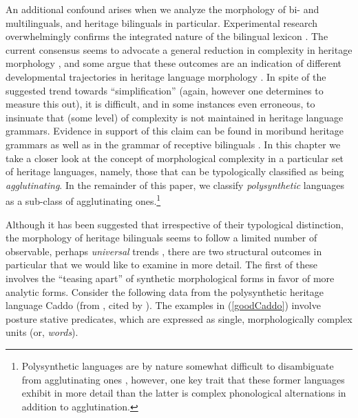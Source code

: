 \documentclass[output=paper,colorlinks,citecolor=brown,footheight=42pt]{langscibook}
\begin{document}
An additional confound arises when we analyze the morphology of bi- and multilinguals, and heritage bilinguals in particular. Experimental research overwhelmingly confirms the integrated nature of the bilingual lexicon \citep{kroll2014speech,PutnamEtAl2018}. The current consensus seems to advocate a general reduction in complexity in heritage morphology \citep{scontras2015,ScontrasEtAl2018}, and some argue that these outcomes are an indication of different developmental trajectories in heritage language morphology \citep{berdicevskis2020}. In spite of the suggested trend towards “simplification” (again, however one determines to measure this out), it is difficult, and in some instances even erroneous, to insinuate that (some level) of complexity is not maintained in heritage language grammars. Evidence in support of this claim can be found in moribund heritage grammars \citep{bousquette2020} as well as in the grammar of receptive bilinguals \citep{sherkinalieber2015}.   
In this chapter we take a closer look at the concept of morphological complexity in a particular set of heritage languages, namely, those that can be typologically classified as being \textit{agglutinating}. In the remainder of this paper, we classify \textit{polysynthetic} languages as a sub-class of agglutinating ones.{\footnote{Polysynthetic languages are by nature somewhat difficult to disambiguate from agglutinating ones \citep{baker1996,mattissen2004structural}, however, one key trait that these former languages exhibit in more detail than the latter is complex phonological alternations in addition to agglutination.}} 

Although it has been suggested that irrespective of their typological distinction, the morphology of heritage bilinguals seems to follow a limited number of observable, perhaps \textit{universal} trends \citep{polinsky2018heritage,PolinskyScontras2020,putnametal2021}, there are two structural outcomes in particular that we would like to examine in more detail. The first of these involves the “teasing apart” of synthetic morphological forms in favor of more analytic forms. Consider the following data from the polysynthetic heritage language Caddo (from \citealt[74]{chafe76}, cited by \citealt[5--6]{melnar2005}). The examples in (\ref{goodCaddo}) involve posture stative predicates, which are expressed as single, morphologically complex units (or, \textit{words}). 
\end{document}
